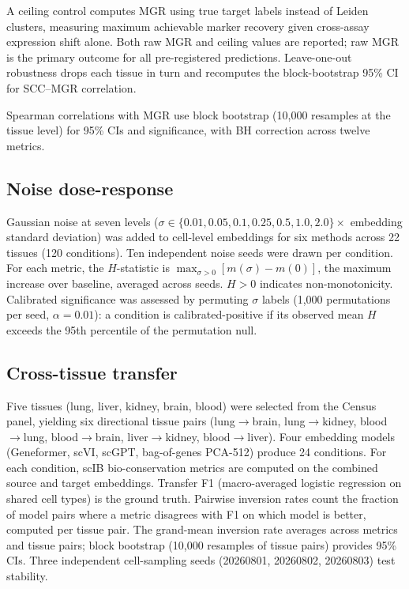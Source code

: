 \documentclass[11pt]{article}
\begin{document}
A ceiling control computes MGR using true target labels instead of
Leiden clusters, measuring maximum achievable marker recovery given
cross-assay expression shift alone. Both raw MGR and ceiling values
are reported; raw MGR is the primary outcome for all pre-registered
predictions. Leave-one-out robustness drops each tissue in turn and
recomputes the block-bootstrap 95\% CI for SCC--MGR correlation.

Spearman correlations with MGR use block bootstrap (10{,}000
resamples at the tissue level) for 95\% CIs and significance, with BH
correction across twelve metrics.

\subsection{Noise dose-response}
\label{sec:noisemethod}

Gaussian noise at seven levels ($\sigma \in \{0.01, 0.05, 0.1, 0.25,
0.5, 1.0, 2.0\} \times$ embedding standard deviation) was added to
cell-level embeddings for six methods across 22 tissues (120
conditions). Ten independent noise seeds were drawn per condition. For
each metric, the $H$-statistic is $\max_{\sigma > 0}[m(\sigma) -
m(0)]$, the maximum increase over baseline, averaged across seeds.
$H > 0$ indicates non-monotonicity. Calibrated significance
was assessed by permuting $\sigma$ labels (1{,}000 permutations per
seed, $\alpha = 0.01$): a condition is calibrated-positive if its
observed mean $H$ exceeds the 95th percentile of the permutation null.

\subsection{Cross-tissue transfer}
\label{sec:crosstissuemethod}

Five tissues (lung, liver, kidney, brain, blood) were selected from the
Census panel, yielding six directional tissue pairs (lung$\to$brain,
lung$\to$kidney, blood$\to$lung, blood$\to$brain, liver$\to$kidney,
blood$\to$liver). Four embedding models (Geneformer, scVI, scGPT,
bag-of-genes PCA-512) produce 24 conditions. For each condition, scIB
bio-conservation metrics are computed on the combined source and target
embeddings. Transfer F1 (macro-averaged logistic regression on shared
cell types) is the ground truth. Pairwise inversion rates count the
fraction of model pairs where a metric disagrees with F1 on which model
is better, computed per tissue pair. The grand-mean inversion rate
averages across metrics and tissue pairs; block bootstrap (10,000
resamples of tissue pairs) provides 95\% CIs. Three independent
cell-sampling seeds (20260801, 20260802, 20260803) test stability.
\end{document}
